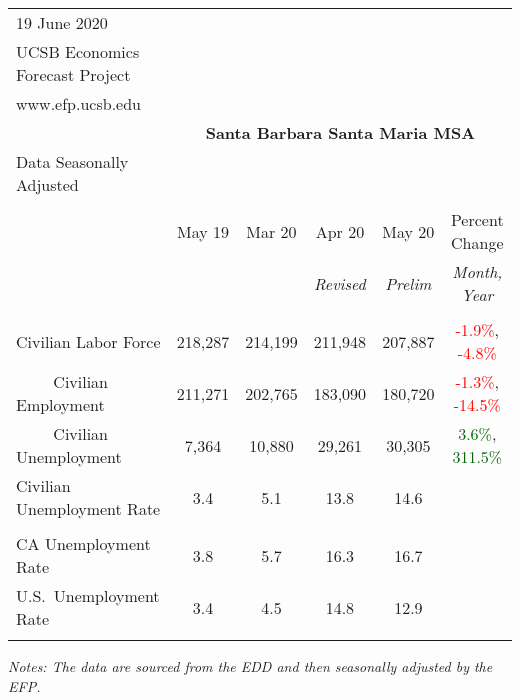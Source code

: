 \documentclass[12pt]{article}
\begin{document}
\begin{table}
\begin{tabular}{|l|c|c|c|c|c|}
\multicolumn{1}{l}{\small 19 June 2020} & \multicolumn{5}{c}{} \\
\multicolumn{1}{l}{\small UCSB Economics Forecast Project} & \multicolumn{5}{c}{} \\
\multicolumn{1}{l}{\small www.efp.ucsb.edu} & \multicolumn{5}{c}{} \\
\multicolumn{1}{c}{} & \multicolumn{5}{c}{\large \textbf{Santa Barbara Santa Maria MSA}} \\
\multicolumn{1}{l}{\small Data Seasonally Adjusted} & \multicolumn{5}{c}{} \\ \hline \hline
& & & & & \\
 & May 19 & Mar 20 & Apr 20 & May 20 & Percent Change \\
 & & & \small \textit{Revised} & \small \textit{Prelim} & \small \textit{Month, Year} \\ \hline
& & & & & \\
Civilian Labor Force & 218,287 & 214,199 & 211,948 & 207,887 & \textcolor{red}{-1.9\%}, \textcolor{red}{-4.8\%} \\
$\qquad$ \small Civilian Employment & 211,271 & 202,765 & 183,090 & 180,720 & \textcolor{red}{-1.3\%}, \textcolor{red}{-14.5\%} \\
$\qquad$ \small Civilian Unemployment & 7,364 & 10,880 & 29,261 & 30,305 & \textcolor{darkgreen}{3.6\%}, \textcolor{darkgreen}{311.5\%} \\
Civilian Unemployment Rate & 3.4 & 5.1 & 13.8 & 14.6 & \\
& & & & & \\
CA Unemployment Rate & 3.8 & 5.7 & 16.3 & 16.7 & \\
U.S.\ Unemployment Rate & 3.4 & 4.5 & 14.8 & 12.9 & \\
& & & & & \\ \hline \hline
\end{tabular}
\par
\vspace{.5em}
\footnotesize
\textit{Notes: The data are sourced from the EDD and then seasonally adjusted by the EFP.}
\end{table}
\end{document}
